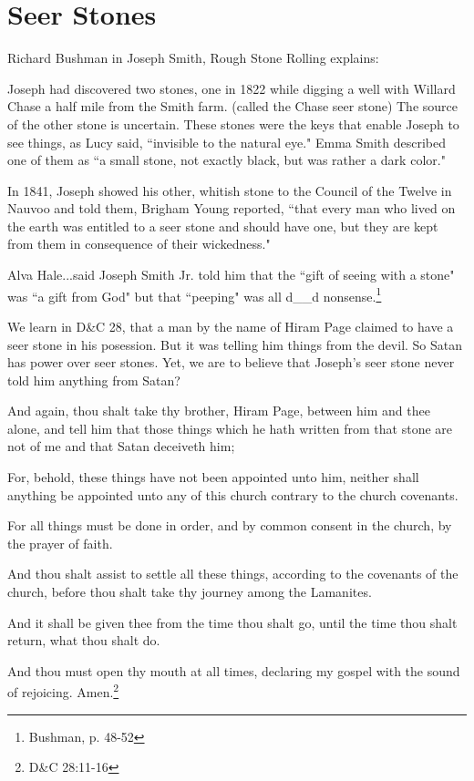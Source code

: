 \chapter{Seer Stones}

Richard Bushman in Joseph Smith, Rough Stone Rolling explains:

\begin{displayquote}
Joseph had discovered two stones, one in 1822 while digging a well with Willard Chase 
a half mile from the Smith farm. (called the Chase seer stone) The source of the 
other stone is uncertain. These stones were the keys that enable Joseph to see 
things, as Lucy said, ``invisible to the natural eye." Emma Smith described one of 
them as ``a small stone, not exactly black, but was rather a dark color."

In 1841, Joseph showed his other, whitish stone to the Council of the Twelve in 
Nauvoo and told them, Brigham Young reported, ``that every man who lived on the 
earth was entitled to a seer stone and should have one, but they are kept from them 
in consequence of their wickedness."

Alva Hale...said Joseph Smith Jr. told him that the ``gift of seeing with a stone" 
was ``a gift from God" but that ``peeping" was all d\_\_d nonsense.\footnote{
Bushman, p. 48-52
} 
\end{displayquote}

We learn in D\&C 28, that a man by the name of Hiram Page claimed to have a seer
stone in his posession. But it was telling him things from the devil. So Satan has
power over seer stones. Yet, we are to believe that Joseph's seer stone never told
him anything from Satan?

\begin{displayquote}
And again, thou shalt take thy brother, Hiram Page, between him and thee alone, 
and tell him that those things which he hath written from that stone are not of me 
and that Satan deceiveth him;

For, behold, these things have not been appointed unto him, neither shall anything 
be appointed unto any of this church contrary to the church covenants.

For all things must be done in order, and by common consent in the church, by 
the prayer of faith.

And thou shalt assist to settle all these things, according to the covenants of 
the church, before thou shalt take thy journey among the Lamanites.

And it shall be given thee from the time thou shalt go, until the time thou shalt 
return, what thou shalt do.

And thou must open thy mouth at all times, declaring my gospel with the sound of 
rejoicing. Amen.\footnote{D\&C 28:11-16}
\end{displayquote}

